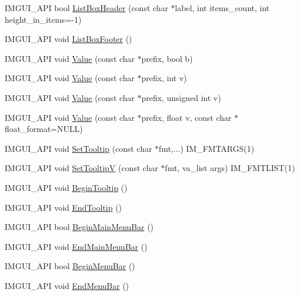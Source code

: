 \begin{DoxyCompactItemize}
\item 
I\+M\+G\+U\+I\+\_\+\+A\+PI bool \hyperlink{namespace_im_gui_a6c5c48e5e5b90365f3f6faaa3307af26}{List\+Box\+Header} (const char $\ast$label, int items\+\_\+count, int height\+\_\+in\+\_\+items=-\/1)
\item 
I\+M\+G\+U\+I\+\_\+\+A\+PI void \hyperlink{namespace_im_gui_a9a0a8f6a4a67280dce7bd91310a83a03}{List\+Box\+Footer} ()
\item 
I\+M\+G\+U\+I\+\_\+\+A\+PI void \hyperlink{namespace_im_gui_a1b3324308e43eeded5c3599fa0f03e85}{Value} (const char $\ast$prefix, bool b)
\item 
I\+M\+G\+U\+I\+\_\+\+A\+PI void \hyperlink{namespace_im_gui_a654ceb70f2dd1598f88861f54764ee08}{Value} (const char $\ast$prefix, int v)
\item 
I\+M\+G\+U\+I\+\_\+\+A\+PI void \hyperlink{namespace_im_gui_aec80a3e35bf7c1ff5704334e5a3ebd5a}{Value} (const char $\ast$prefix, unsigned int v)
\item 
I\+M\+G\+U\+I\+\_\+\+A\+PI void \hyperlink{namespace_im_gui_a0c8b87438082a1d0a46ae2a76090ca16}{Value} (const char $\ast$prefix, float v, const char $\ast$float\+\_\+format=N\+U\+LL)
\item 
I\+M\+G\+U\+I\+\_\+\+A\+PI void \hyperlink{namespace_im_gui_a313073fa01b8a9791f241ef93091ce92}{Set\+Tooltip} (const char $\ast$fmt,...) I\+M\+\_\+\+F\+M\+T\+A\+R\+GS(1)
\item 
I\+M\+G\+U\+I\+\_\+\+A\+PI void \hyperlink{namespace_im_gui_a3826acf68fc4a12bb66401575f51d6a2}{Set\+TooltipV} (const char $\ast$fmt, va\+\_\+list args) I\+M\+\_\+\+F\+M\+T\+L\+I\+ST(1)
\item 
I\+M\+G\+U\+I\+\_\+\+A\+PI void \hyperlink{namespace_im_gui_a36816a48385f4759d746a03cf6202512}{Begin\+Tooltip} ()
\item 
I\+M\+G\+U\+I\+\_\+\+A\+PI void \hyperlink{namespace_im_gui_ac8d75c160cfdf43d512f773ca133a1c6}{End\+Tooltip} ()
\item 
I\+M\+G\+U\+I\+\_\+\+A\+PI bool \hyperlink{namespace_im_gui_a55cb9cfb9865204ac6fb21c965784f78}{Begin\+Main\+Menu\+Bar} ()
\item 
I\+M\+G\+U\+I\+\_\+\+A\+PI void \hyperlink{namespace_im_gui_ab92f330c808546b340eb7bdf7e5f7c95}{End\+Main\+Menu\+Bar} ()
\item 
I\+M\+G\+U\+I\+\_\+\+A\+PI bool \hyperlink{namespace_im_gui_a4852dff802922163fc747e2e0df5b88f}{Begin\+Menu\+Bar} ()
\item 
I\+M\+G\+U\+I\+\_\+\+A\+PI void \hyperlink{namespace_im_gui_aa226265c140eb6ee375c5b9abc69c4fc}{End\+Menu\+Bar} ()

\end{DoxyCompactItemize}
